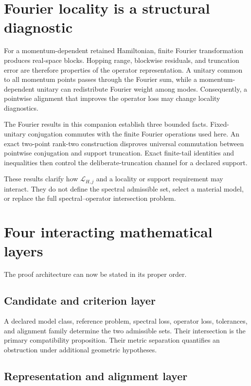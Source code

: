 \section{Fourier locality is a structural diagnostic}

For a momentum-dependent retained Hamiltonian, finite Fourier transformation produces
real-space blocks.  Hopping range, blockwise residuals, and truncation error are
therefore properties of the operator representation.  A unitary common to all momentum
points passes through the Fourier sum, while a momentum-dependent unitary can
redistribute Fourier weight among modes.  Consequently, a pointwise alignment that
improves the operator loss may change locality diagnostics.

The Fourier results in this companion establish three bounded facts.  Fixed-unitary
conjugation commutes with the finite Fourier operations used here.  An exact two-point
rank-two construction disproves universal commutation between pointwise conjugation and
support truncation.  Exact finite-tail identities and inequalities then control the
deliberate-truncation channel for a declared support.

These results clarify how $\mathcal L_{H,j}$ and a locality or support requirement may
interact.  They do not define the spectral admissible set, select a material model, or
replace the full spectral--operator intersection problem.

\section{Four interacting mathematical layers}

The proof architecture can now be stated in its proper order.

\subsection{Candidate and criterion layer}

A declared model class, reference problem, spectral loss, operator loss, tolerances, and
alignment family determine the two admissible sets.  Their intersection is the primary
compatibility proposition.  Their metric separation quantifies an obstruction under
additional geometric hypotheses.

\subsection{Representation and alignment layer}

